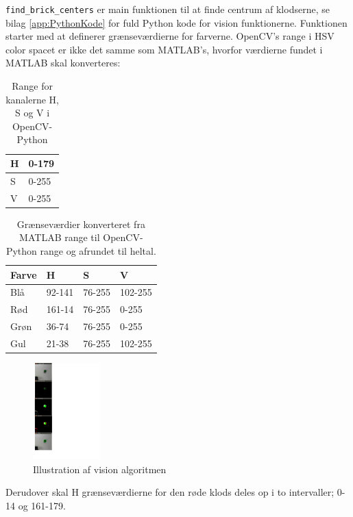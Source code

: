 \texttt{find\_brick\_centers} er main funktionen til at finde centrum af klodserne, se bilag \vref{app:PythonKode} for fuld Python kode for vision funktionerne.
Funktionen starter med at definerer grænseværdierne for farverne.
OpenCV's range i HSV color spacet er ikke det samme som MATLAB's, hvorfor værdierne fundet i MATLAB skal konverteres:
\begin{table}[H]
\centering
\begin{tabular}{l|l}
H		&	0-179\\
\hline
S		&	0-255\\
\hline
V		&	0-255\\
\end{tabular}	
\caption{Range for kanalerne H, S og V i OpenCV-Python}
\end{table}

\begin{table}[H]
\centering
\begin{tabular}{l|l|l|l}
Farve	&	H			&	S			&	V	\\
\hline
Blå		&	92-141		&	76-255	&	102-255	\\
Rød		&	161-14		&	76-255	&	0-255	\\
Grøn	&	36-74		&	76-255	&	0-255	\\
Gul		&	21-38		&	76-255	&	102-255	\\
\end{tabular}	
\caption{Grænseværdier konverteret fra MATLAB range til OpenCV-Python range og afrundet til heltal.}
\end{table}

\begin{figure}
  \begin{center}
    \includegraphics[width=0.23\textwidth]{figurer/ImagesFromVision}
  \end{center}
  \caption{Illustration af vision algoritmen}\label{fig:ImagesFromVision}
\end{figure}

Derudover skal H grænseværdierne for den røde klods deles op i to intervaller; 0-14 og 161-179.

